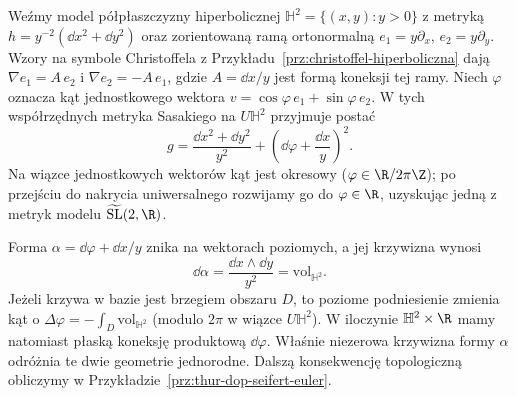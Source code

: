 
\begin{przyklad}
\label{prz:thur-dop-tilde-sl-metryka}
Weźmy model półpłaszczyzny hiperbolicznej
$\mathbb H^2=\{(x,y):y>0\}$ z metryką
$h=y^{-2}(\dd x^2+\dd y^2)$ oraz zorientowaną
ramą ortonormalną $e_1=y\partial_x$, $e_2=y\partial_y$.
Wzory na symbole Christoffela z
Przykładu~\ref{prz:christoffel-hiperboliczna} dają
$\nabla e_1=A\,e_2$ i $\nabla e_2=-A\,e_1$,
gdzie $A=\dd x/y$ jest formą koneksji tej ramy.
Niech $\varphi$ oznacza kąt jednostkowego wektora
$v=\cos\varphi\,e_1+\sin\varphi\,e_2$.
W tych współrzędnych metryka Sasakiego na $U\mathbb H^2$
przyjmuje postać
\begin{equation}\label{eq:thur-dop-tilde-sl-metryka}
 g=\frac{\dd x^2+\dd y^2}{y^2}
    +\left(\dd\varphi+\frac{\dd x}{y}\right)^2.
\end{equation}
Na wiązce jednostkowych wektorów kąt jest okresowy
($\varphi\in\R/2\pi\Z$); po przejściu do nakrycia
uniwersalnego rozwijamy go do $\varphi\in\R$,
uzyskując jedną z metryk modelu
$\widetilde{\mathrm{SL}}(2,\R)$.

Forma $\alpha=\dd\varphi+\dd x/y$ znika na
wektorach poziomych, a jej krzywizna wynosi
\[
 \dd\alpha=\frac{\dd x\wedge\dd y}{y^2}
     =\mathrm{vol}_{\mathbb H^2}.
\]
Jeżeli krzywa w bazie jest brzegiem obszaru $D$,
to poziome podniesienie zmienia kąt o
$\Delta\varphi=-\int_D\mathrm{vol}_{\mathbb H^2}$
(modulo $2\pi$ w wiązce $U\mathbb H^2$).
W iloczynie $\mathbb H^2\times\R$ mamy natomiast
płaską koneksję produktową $\dd\varphi$.
Właśnie niezerowa krzywizna formy $\alpha$ odróżnia
te dwie geometrie jednorodne. Dalszą konsekwencję
topologiczną obliczymy w
Przykładzie~\ref{prz:thur-dop-seifert-euler}.
\end{przyklad}
